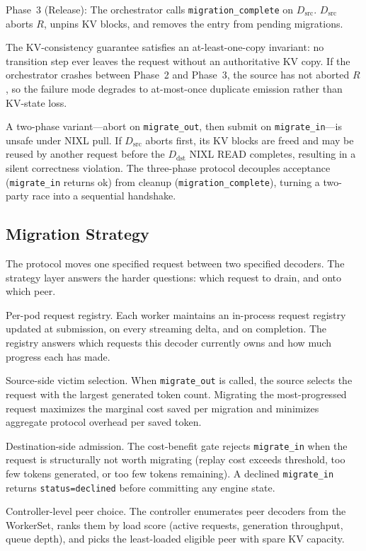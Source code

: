 \documentclass[10pt,twocolumn,letterpaper]{article}
\begin{document}
Phase~3 (Release): The orchestrator calls \texttt{migration\_complete} on $D_{\text{src}}$. $D_{\text{src}}$ aborts $R$, unpins KV blocks, and removes the entry from pending migrations.

The KV-consistency guarantee satisfies an at-least-one-copy invariant: no transition step ever leaves the request without an authoritative KV copy. If the orchestrator crashes between Phase~2 and Phase~3, the source has not aborted $R$, so the failure mode degrades to at-most-once duplicate emission rather than KV-state loss.

A two-phase variant---abort on \texttt{migrate\_out}, then submit on \texttt{migrate\_in}---is unsafe under NIXL pull. If $D_{\text{src}}$ aborts first, its KV blocks are freed and may be reused by another request before the $D_{\text{dst}}$ NIXL READ completes, resulting in a silent correctness violation. The three-phase protocol decouples acceptance (\texttt{migrate\_in} returns ok) from cleanup (\texttt{migration\_complete}), turning a two-party race into a sequential handshake.

\subsection{Migration Strategy}
\label{sec:mig-strategy}

The protocol moves one specified request between two specified decoders. The strategy layer answers the harder questions: which request to drain, and onto which peer.

Per-pod request registry. Each worker maintains an in-process request registry updated at submission, on every streaming delta, and on completion. The registry answers which requests this decoder currently owns and how much progress each has made.

Source-side victim selection. When \texttt{migrate\_out} is called, the source selects the request with the largest generated token count. Migrating the most-progressed request maximizes the marginal cost saved per migration and minimizes aggregate protocol overhead per saved token.

Destination-side admission. The cost-benefit gate rejects \texttt{migrate\_in} when the request is structurally not worth migrating (replay cost exceeds threshold, too few tokens generated, or too few tokens remaining). A declined \texttt{migrate\_in} returns \texttt{status=declined} before committing any engine state.

Controller-level peer choice. The controller enumerates peer decoders from the WorkerSet, ranks them by load score (active requests, generation throughput, queue depth), and picks the least-loaded eligible peer with spare KV capacity.
\end{document}

